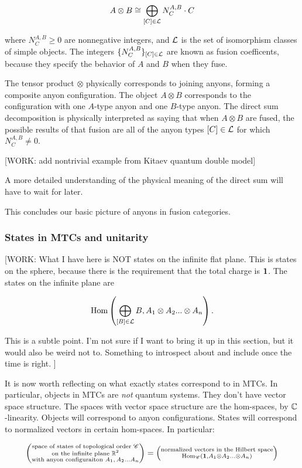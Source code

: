 $$A\otimes B \cong \bigoplus_{[C]\in \mathcal{L}}N^{A,B}_{C}\cdot C$$

where $N^{A,B}_{C}\geq 0$ are nonnegative integers, and $\mathcal{L}$ is the set of isomorphism classes of simple objects. The integers $\{N^{A,B}_C\}_{[C]\in \mathcal{L}}$ are known as fusion coefficents, because they specify the behavior of $A$ and $B$ when they fuse.

The tensor product $\otimes$ physically corresponds to joining anyons, forming a composite anyon configuration. The object $A\otimes B$ corresponds to the configuration with one $A$-type anyon and one $B$-type anyon. The direct sum decomposition is physically interpreted as saying that when $A\otimes B$ are fused, the possible results of that fusion are all of the anyon types $[C]\in \mathcal{L}$ for which $N^{A,B}_{C}\neq 0$.

[WORK: add nontrivial example from Kitaev quantum double model]

A more detailed understanding of the physical meaning of the direct sum will have to wait for later.

This concludes our basic picture of anyons in fusion categories.

\subsubsection{States in MTCs and unitarity}

[WORK: What I have here is NOT states on the infinite flat plane. This is states on the sphere, because there is the requirement that the total charge is $\mathbf{1}$. The states on the infinite plane are

$$\operatorname{Hom}\left(\bigoplus_{[B]\in \mathcal{L}}B, A_1\otimes A_2 ... \otimes A_n \right).$$

This is a subtle point. I'm not sure if I want to bring it up in this section, but it would also be weird not to. Something to introspect about and include once the time is right.
]

It is now worth reflecting on what exactly states correspond to in MTCs. In particular, objects in MTCs are \textit{not} quantum systems. They don't have vector space structure. The spaces with vector space structure are the hom-spaces, by $\mathbb{C}$-linearity. Objects will correspond to anyon configurations. States will correspond to normalized vectors in certain hom-spaces. In particular:

\begin{equation*}
\left(\substack{\text{space of states of topological order $\mathscr{C}$} \\ \text{on the infinite plane $\mathbb{R}^2$} \\ \text{with anyon configuraiton $A_1,A_2...A _n$}}\right)
=
\left(
\substack{
\text{normalized vectors in the Hilbert space}\\
\operatorname{Hom}_{\mathscr{C}}(\mathbf{1}, A_1\otimes A_2... \otimes A_n)
}
\right)
\end{equation*}

